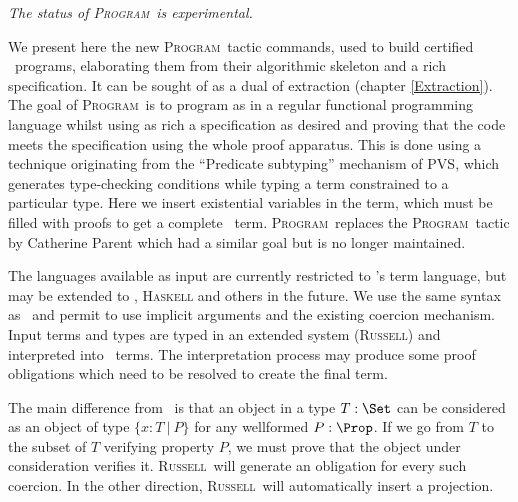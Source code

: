 \def\Program{\textsc{Program}}
\def\Russell{\textsc{Russell}}
\def\PVS{\textsc{PVS}}

\achapter{\Program{}}
\label{Program}

\begin{flushleft}
  \em The status of \Program\ is experimental.
\end{flushleft}

We present here the new \Program\ tactic commands, used to build certified
\Coq\ programs, elaborating them from their algorithmic skeleton and a
rich specification. It can be sought of as a dual of extraction
(chapter \ref{Extraction}). The goal of \Program~is to program as in a regular
functional programming language whilst using as rich a specification as 
desired and proving that the code meets the specification using the whole \Coq{} proof
apparatus. This is done using a technique originating from the
``Predicate subtyping'' mechanism of \PVS \cite{Rushby98}, which generates type-checking
conditions while typing a term constrained to a particular type. 
Here we insert existential variables in the term, which must be filled
with proofs to get a complete \Coq\ term. \Program\ replaces the
\Program\ tactic by Catherine Parent \cite{Parent95b} which had a similar goal but is no longer
maintained.

The languages available as input are currently restricted to \Coq's term
language, but may be extended to \ocaml{}, \textsc{Haskell} and others
in the future. We use the same syntax as \Coq\ and permit to use implicit
arguments and the existing coercion mechanism.
Input terms and types are typed in an extended system (\Russell) and
interpreted into \Coq\ terms. The interpretation process may produce
some proof obligations which need to be resolved to create the final term.

The main difference from \Coq\ is that an object in a type $T : \Set$
can be considered as an object of type $\{ x : T~|~P\}$ for any
wellformed $P : \Prop$. 
If we go from $T$ to the subset of $T$ verifying property $P$, we must
prove that the object under consideration verifies it. \Russell\ will
generate an obligation for every such coercion. In the other direction,
\Russell\ will automatically insert a projection.

